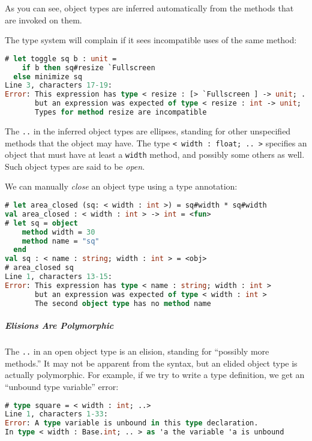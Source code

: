 As you can see, object types are inferred automatically from the methods
that are invoked on them.

The type system will complain if it sees incompatible uses of the same
method:

\begin{lstlisting}[language=Caml]
# let toggle sq b : unit =
    if b then sq#resize `Fullscreen
  else minimize sq
Line 3, characters 17-19:
Error: This expression has type < resize : [> `Fullscreen ] -> unit; .. >
       but an expression was expected of type < resize : int -> unit; .. >
       Types for method resize are incompatible
\end{lstlisting}

The \passthrough{\lstinline!..!} in the inferred object types are
ellipses, standing for other unspecified methods that the object may
have. The type \passthrough{\lstinline!< width : float; .. >!} specifies
an object that must have at least a \passthrough{\lstinline!width!}
method, and possibly some others as well. Such object types are said to
be \emph{open}. 

We can manually \emph{close} an object type using a type annotation:

\begin{lstlisting}[language=Caml]
# let area_closed (sq: < width : int >) = sq#width * sq#width
val area_closed : < width : int > -> int = <fun>
# let sq = object
    method width = 30
    method name = "sq"
  end
val sq : < name : string; width : int > = <obj>
# area_closed sq
Line 1, characters 13-15:
Error: This expression has type < name : string; width : int >
       but an expression was expected of type < width : int >
       The second object type has no method name
\end{lstlisting}

\hypertarget{elisions-are-polymorphic}{%
\subparagraph{Elisions Are Polymorphic}\label{elisions-are-polymorphic}}

The \passthrough{\lstinline!..!} in an open object type is an elision,
standing for ``possibly more methods.'' It may not be apparent from the
syntax, but an elided object type is actually polymorphic. For example,
if we try to write a type definition, we get an ``unbound type
variable'' error: 

\begin{lstlisting}[language=Caml]
# type square = < width : int; ..>
Line 1, characters 1-33:
Error: A type variable is unbound in this type declaration.
In type < width : Base.int; .. > as 'a the variable 'a is unbound
\end{lstlisting}

